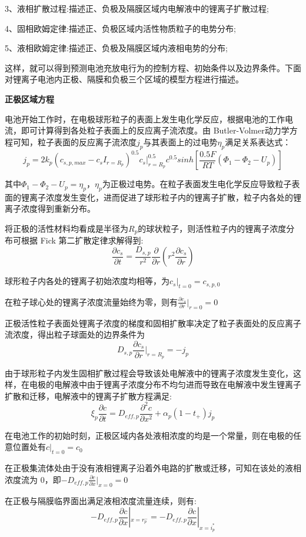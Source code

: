 \documentclass[12pt]{ctexart}%
\begin{document}
3、液相扩散过程:描述正、负极及隔膜区域内电解液中的锂离子扩散过程;

4、固相欧姆定律:描述正、负极区域内活性物质粒子的电势分布;

5、液相欧姆定律:描述正、负极及隔膜区域内液相电势的分布;

这样，就可以得到预测电池充放电行为的控制方程、初始条件以及边界条件。下面对锂离子电池内正极、隔膜和负极三个区域的模型方程进行描述。

\noindent\textbf{正极区域方程}

电池开始工作时，在电极球形粒子的表面上发生电化学反应，根据电池的工作电流，即可计算得到各处粒子表面上的反应离子流浓度。由 Butler-Volmer动力学方程可知，粒子表面的反应离子流浓度$j_p$与其表面上的过电势$\eta_{p}$满足关系表达式：
$$j_p = 2k_p(c_{s,p,max} - c_sI_{r=R_p})^{0.5}c_s|^{0.5}_{r=R_p}c^{0.5}sinh[\frac{0.5F}{RT}(\Phi_1-\Phi_2-U_p)]$$

其中$\Phi_1-\Phi_2-U_p = \eta_{p}$，$\eta_{p}$为正极过电势。在粒子表面发生电化学反应导致粒子表面的锂离子浓度发生变化，进而促进了球形粒子内的锂离子扩散，粒子内各处的锂离子浓度得到重新分布。

将正极的活性材料均看成是半径为$R_p$的球状粒子，则活性粒子内的锂离子浓度分布可根据 Fick 第二扩散定律求解得到:
$$\frac{\partial c_s}{\partial t} = \frac{D_{s,p}}{r^2}\frac{\partial}{\partial r}(r^2\frac{\partial c_s}{\partial r})$$

球形粒子内各处的锂离子初始浓度均相等，为$c_s|_{t=0} = c_{s,p,0}$

在粒子球心处的锂离子浓度流量始终为零，则有$\frac{\partial c_s}{\partial r}|_{r=0} = 0$

正极活性粒子表面处锂离子浓度的梯度和固相扩散率决定了粒子表面处的反应离子流浓度，得出粒子球面处的边界条件为
$$D_{s,p}\frac{\partial c_s}{\partial r}|_{r=R_p} = -j_p$$

由于球形粒子内发生固相扩散过程会导致该处电解液中的锂离子浓度发生变化，这样，在电极的电解液中由于锂离子浓度分布不均匀进而导致在电解液中发生锂离子扩散和迁移，电解液中的锂离子扩散方程\cite{Diwakar2009TowardsEM}满足:
$$\xi_p\frac{\partial c}{\partial t}=D_{eff,p}\frac{\partial^2 c}{\partial x^2}+\alpha_p(1-t_+)j_p$$

在电池工作的初始时刻，正极区域内各处液相浓度的均是一个常量，则在电极的任意位置处有$c|_{t=0} = c_0$

在正极集流体处由于没有液相锂离子沿着外电路的扩散或迁移，可知在该处的液相浓度流为 0，即$-D_{eff,p}\frac{\partial c}{\partial x}|_{x=0} = 0$

在正极与隔膜临界面出满足液相浓度流量连续，则有:
$$-D_{eff,p}\frac{\partial c}{\partial x}|_{x=r^-_p} = -D_{eff,p}\frac{\partial c}{\partial x}|_{x=i^*_p}$$
\end{document}
